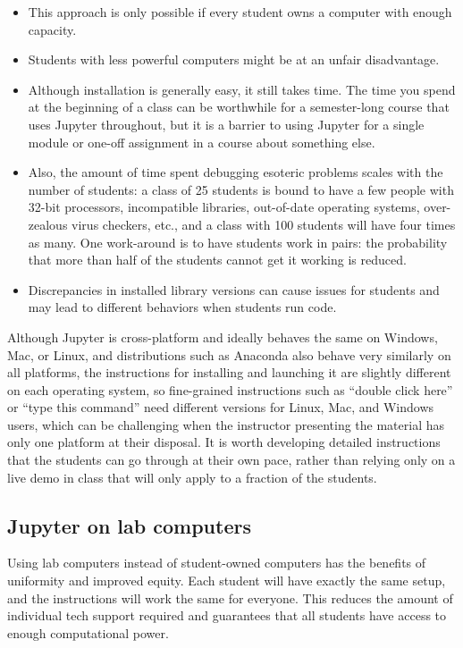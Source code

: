 \documentclass[]{book}
\begin{document}
\begin{itemize}
\item
  This approach is only possible if every student owns a computer with
  enough capacity.
\item
  Students with less powerful computers might be at an unfair
  disadvantage.
\item
  Although installation is generally easy, it still takes time. The time
  you spend at the beginning of a class can be worthwhile for a
  semester-long course that uses Jupyter throughout, but it is a barrier
  to using Jupyter for a single module or one-off assignment in a course
  about something else.
\item
  Also, the amount of time spent debugging esoteric problems scales with
  the number of students: a class of 25 students is bound to have a few
  people with 32-bit processors, incompatible libraries, out-of-date
  operating systems, over-zealous virus checkers, etc., and a class with
  100 students will have four times as many. One work-around is to have
  students work in pairs: the probability that more than half of the
  students cannot get it working is reduced.
\item
  Discrepancies in installed library versions can cause issues for
  students and may lead to different behaviors when students run code.
\end{itemize}

Although Jupyter is cross-platform and ideally behaves the same on
Windows, Mac, or Linux, and distributions such as Anaconda also behave
very similarly on all platforms, the instructions for installing and
launching it are slightly different on each operating system, so
fine-grained instructions such as ``double click here'' or ``type this
command'' need different versions for Linux, Mac, and Windows users,
which can be challenging when the instructor presenting the material has
only one platform at their disposal. It is worth developing detailed
instructions that the students can go through at their own pace, rather
than relying only on a live demo in class that will only apply to a
fraction of the students.

\subsection{Jupyter on lab computers}\label{jupyter-on-lab-computers}

Using lab computers instead of student-owned computers has the benefits
of uniformity and improved equity. Each student will have exactly the
same setup, and the instructions will work the same for everyone. This
reduces the amount of individual tech support required and guarantees
that all students have access to enough computational power.
\end{document}
